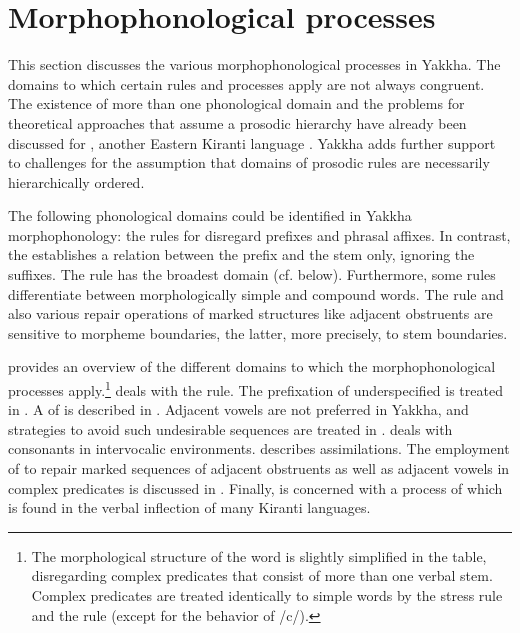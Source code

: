 \section{Morphophonological processes}\label{morphophon}



This section discusses the various morphophonological processes in Yakkha. The domains to which certain rules and processes apply are not always congruent. The existence of more than one phonological domain and the problems for theoretical approaches that assume a prosodic hierarchy have already been discussed for , another Eastern Kiranti language  \citep{Hildebrandt2007Prosodic, Schieringetal2010The-prosodic}. Yakkha adds further support to challenges for the assumption that domains of prosodic rules are necessarily hierarchically ordered. 

The following phonological domains could be identified in Yakkha morpho\-pho\-no\-logy: the rules for  disregard prefixes and phrasal affixes. In contrast, the  establishes a relation between the prefix and the stem only, ignoring the suffixes. The  rule has the broadest domain (cf.  below). Furthermore, some rules differentiate between morphologically simple and compound words. The  rule and also various repair operations of marked structures like adjacent obstruents are sensitive to morpheme boundaries, the latter, more precisely,  to stem boundaries. 

 provides an overview of the different domains to which the morphophonological processes apply.\footnote{The morphological structure of the word is slightly simplified in the table, disregarding complex predicates that consist of more than one verbal stem. Complex predicates are treated identically to simple words by the stress rule and the  rule (except for the behavior of /c/).}  deals with  the  rule. The prefixation of underspecified  is treated in . A  of  is described in . Adjacent vowels are not preferred in Yakkha, and strategies to avoid such undesirable sequences are treated in .  deals with consonants in intervocalic environments.  describes assimilations. The employment of  to repair marked sequences of adjacent obstruents as well as adjacent vowels in complex predicates is discussed in . Finally,  is concerned with a process of  which is found in the verbal inflection of many Kiranti languages.


